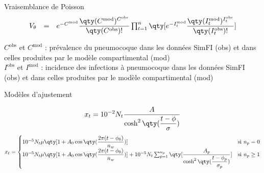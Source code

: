 \begin{frame}{Vraisemblance de Poisson}
		\begin{eqnarray*}
			\begin{array}{lcl}
				V_\theta & = & e^{-C^{\text{mod}}} \dfrac{\qty(C^{\text{mod}})^{C^{\text{obs}}}}{\qty(C^{\text{obs}})!} \prod_{t = 1}^{n} \qty[e^{-I^{\text{mod}}_t} \dfrac{\qty(I^{\text{mod}}_t)^{I^{\text{obs}}_t}}{\qty(I^{\text{obs}}_t)!}]
			\end{array}
		\end{eqnarray*}
		
		\bigskip
		$C^{\text{obs}}$ et $C^{\text{mod}}$ : prévalence du pneumocoque dans les données SimFI (obs) et dans celles produites par le modèle compartimental (mod)\\
		$I^{\text{obs}}$ et $I^{\text{mod}}$ : incidence des infections à pneumocoque dans les données SimFI (obs) et dans celles produites par le modèle compartimental (mod)
\end{frame}


\begin{frame}{Modèles d'ajustement}
\begin{scriptsize}
\begin{eqnarray*}
	x_t = 10^{-2}N_t\dfrac{A}{\cosh^2\qty(\dfrac{t-\phi}{\sigma})}
\end{eqnarray*}
\begin{eqnarray*}
	x_t =
\begin{cases}
	10^{-5}N_t\mu\qty[1 + A_0\cos\qty(\dfrac{2\pi(t-\phi_0)}{n_w})] & \text{si } n_p = 0 \\
	10^{-5}N_t\mu\qty[1 + A_0\cos\qty(\dfrac{2\pi(t-\phi_0)}{n_w})] + 10^{-5}N_t\sum_{p=1}^{n_p}\qty[\dfrac{A_p}{\cosh^2\qty(\dfrac{t-\phi_p}{\sigma_p})}] & \text{si } n_p \geq 1
\end{cases}
\end{eqnarray*}
\end{scriptsize}
\end{frame}


